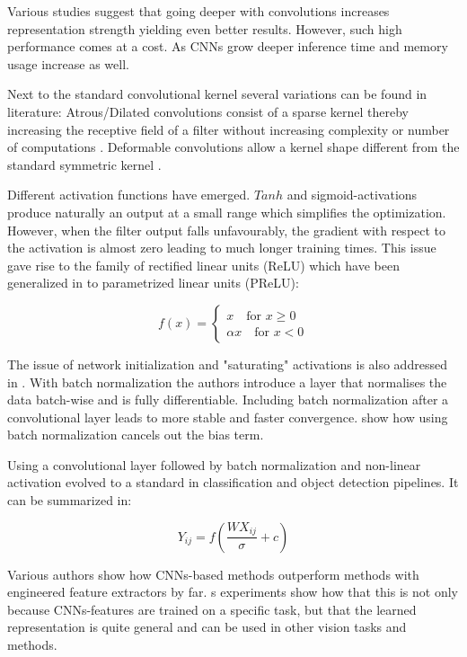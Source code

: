 	Various studies suggest that going deeper with convolutions increases representation strength yielding even better results. However, such high performance comes at a cost. As \acp{CNN} grow deeper inference time and memory usage increase as well.
	
	Next to the standard convolutional kernel several variations can be found in literature: Atrous/Dilated convolutions consist of a sparse kernel thereby increasing the receptive field of a filter without increasing complexity or number of computations . Deformable convolutions allow a kernel shape different from the standard symmetric kernel .
	
	Different activation functions have emerged. $Tanh$ and sigmoid-activations produce naturally an output at a small range which simplifies the optimization. However, when the filter output falls unfavourably, the gradient with respect to the activation is almost zero leading to much longer training times. This issue gave rise to the family of rectified linear units (ReLU) which have been generalized in  to parametrized linear units (PReLU):
	
	$$
	f(x) = \begin{cases}
	x \quad \text{for } x \geq 0 \\
	\alpha x \quad \text{for } x < 0
	\end{cases}
	$$
	
	The issue of network initialization and "saturating" activations is also addressed in \cite{Ioffe2015}. With batch normalization the authors introduce a layer that normalises the data batch-wise and is fully differentiable. Including batch normalization after a convolutional layer leads to more stable and faster convergence.  show how using batch normalization cancels out the bias term.
	
	Using a convolutional layer followed by batch normalization and non-linear activation evolved to a standard in classification and object detection pipelines. It can be summarized in:
	
	$$
	Y_{ij} = f(\frac{WX_{ij}}{\sigma}+c)
	$$
	
	
	
	
	
	Various authors show how \acp{CNN}-based methods outperform methods with engineered feature extractors by far. \cite{Razavian}s experiments show how that this is not only because \acp{CNN}-features are trained on a specific task, but that  the learned representation is quite general and can be used in other vision tasks and methods.
	
